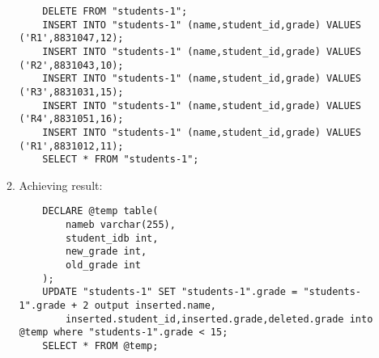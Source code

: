 \documentclass{article}
\begin{document}
\begin{enumerate}
\begin{enumerate}
	\begin{verbatim}
	DELETE FROM "students-1";
	INSERT INTO "students-1" (name,student_id,grade) VALUES ('R1',8831047,12);
	INSERT INTO "students-1" (name,student_id,grade) VALUES ('R2',8831043,10);
	INSERT INTO "students-1" (name,student_id,grade) VALUES ('R3',8831031,15);
	INSERT INTO "students-1" (name,student_id,grade) VALUES ('R4',8831051,16);
	INSERT INTO "students-1" (name,student_id,grade) VALUES ('R1',8831012,11);
	SELECT * FROM "students-1";
\end{verbatim}
\item Achieving result:

	
	\begin{verbatim}
	DECLARE @temp table(
		nameb varchar(255),
		student_idb int,
		new_grade int,
		old_grade int
	);
	UPDATE "students-1" SET "students-1".grade = "students-1".grade + 2 output inserted.name,
		inserted.student_id,inserted.grade,deleted.grade into @temp where "students-1".grade < 15;
	SELECT * FROM @temp;
\end{verbatim}
	\end{enumerate}
\end{enumerate}
\end{document}
